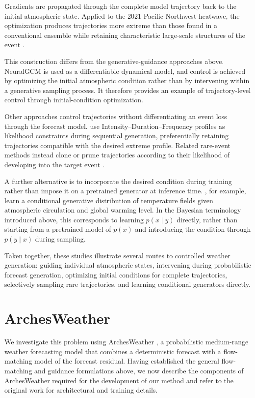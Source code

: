 Gradients are propagated through the complete model trajectory back to the
initial atmospheric state. Applied to the 2021 Pacific Northwest heatwave,
the optimization produces trajectories more extreme than those found in a
conventional ensemble while retaining characteristic large-scale structures
of the event \parencite{whittaker2025heatwaves}.

This construction differs from the generative-guidance approaches above.
NeuralGCM is used as a differentiable dynamical model, and control is achieved
by optimizing the initial atmospheric condition rather than by intervening
within a generative sampling process. It therefore provides an example of
trajectory-level control through initial-condition optimization.

Other approaches control trajectories without differentiating an event loss
through the forecast model. \textcite{he2026extremeprofiles} use
Intensity--Duration--Frequency profiles as likelihood constraints during
sequential generation, preferentially retaining trajectories compatible with
the desired extreme profile. Related rare-event methods instead clone or prune
trajectories according to their likelihood of developing into the target event
\parencite{lancelin2025rareevent}.

A further alternative is to incorporate the desired condition during training
rather than impose it on a pretrained generator at inference time.
\textcite{loer2026storyline}, for example, learn a conditional generative
distribution of temperature fields given atmospheric circulation and global
warming level. In the Bayesian terminology introduced above, this corresponds
to learning $p(x\mid y)$ directly, rather than starting from a pretrained model
of $p(x)$ and introducing the condition through $p(y\mid x)$ during sampling.

Taken together, these studies illustrate several routes to controlled weather
generation: guiding individual atmospheric states, intervening during
probabilistic forecast generation, optimizing initial conditions for complete
trajectories, selectively sampling rare trajectories, and learning conditional
generators directly.

\section{ArchesWeather}

We investigate this problem using ArchesWeather
\parencite{couairon2024archesweather}, a probabilistic medium-range weather
forecasting model that combines a deterministic forecast with a flow-matching
model of the forecast residual.
Having established the general flow-matching and guidance formulations above,
we now describe the components of ArchesWeather required for the development
of our method and refer to the original work for architectural and training
details.

